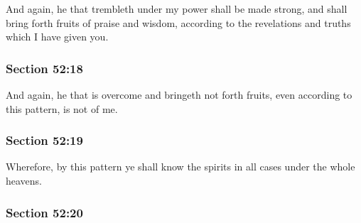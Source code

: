 		And again, he that trembleth under my power shall be made strong, and shall bring forth fruits of praise and wisdom, according to the revelations and truths which I have given you.


	\subsubsection{Section 52:18} %
		\label{DC52-18}

		And again, he that is overcome and bringeth not forth fruits, even according to this pattern, is not of me.


	\subsubsection{Section 52:19} %
		\label{DC52-19}

		Wherefore, by this pattern ye shall know the spirits in all cases under the whole heavens.


	\subsubsection{Section 52:20} %
		\label{DC52-20}

